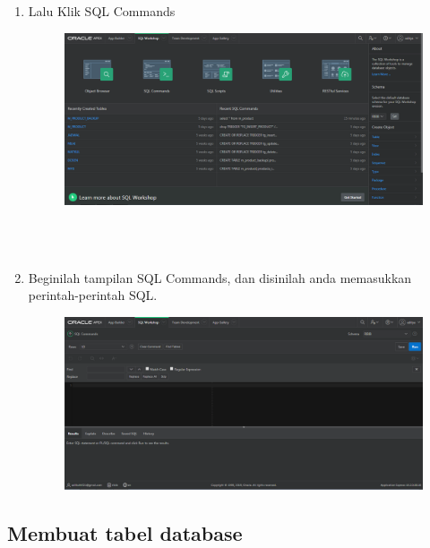 \documentclass[12pt, times new roman, a4paper]{report}
\begin{document}
\begin{enumerate}
\item Lalu Klik SQL Commands
\begin{figure} [h]
	\centering
		\includegraphics[scale=0.25]{gambar/2}
\end{figure}
\\
\\	
\item Beginilah tampilan SQL Commands, dan disinilah anda memasukkan perintah-perintah SQL.
\begin{figure} [h]
	\centering
		\includegraphics[scale=0.3]{gambar/3}
\end{figure}
\end{enumerate}

\subsection{Membuat tabel database}
\end{document}
